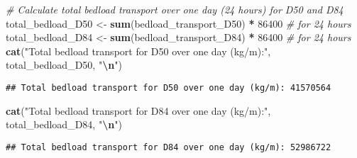 \documentclass[
]{article}
\newenvironment{Shaded}{\begin{snugshade}}{\end{snugshade}}
\newcommand{\CommentTok}[1]{\textcolor[rgb]{0.56,0.35,0.01}{\textit{#1}}}
\newcommand{\DecValTok}[1]{\textcolor[rgb]{0.00,0.00,0.81}{#1}}
\newcommand{\FunctionTok}[1]{\textcolor[rgb]{0.13,0.29,0.53}{\textbf{#1}}}
\newcommand{\NormalTok}[1]{#1}
\newcommand{\OtherTok}[1]{\textcolor[rgb]{0.56,0.35,0.01}{#1}}
\newcommand{\SpecialCharTok}[1]{\textcolor[rgb]{0.81,0.36,0.00}{\textbf{#1}}}
\newcommand{\StringTok}[1]{\textcolor[rgb]{0.31,0.60,0.02}{#1}}
\begin{document}
\begin{Shaded}
\begin{Highlighting}[]
\CommentTok{\# Calculate total bedload transport over one day (24 hours) for D50 and D84}
\NormalTok{total\_bedload\_D50 }\OtherTok{\textless{}{-}} \FunctionTok{sum}\NormalTok{(bedload\_transport\_D50) }\SpecialCharTok{*} \DecValTok{86400}  \CommentTok{\# for 24 hours}
\NormalTok{total\_bedload\_D84 }\OtherTok{\textless{}{-}} \FunctionTok{sum}\NormalTok{(bedload\_transport\_D84) }\SpecialCharTok{*} \DecValTok{86400}  \CommentTok{\# for 24 hours}
\FunctionTok{cat}\NormalTok{(}\StringTok{"Total bedload transport for D50 over one day (kg/m):"}\NormalTok{, total\_bedload\_D50, }\StringTok{"}\SpecialCharTok{\textbackslash{}n}\StringTok{"}\NormalTok{)}
\end{Highlighting}
\end{Shaded}

\begin{verbatim}
## Total bedload transport for D50 over one day (kg/m): 41570564
\end{verbatim}

\begin{Shaded}
\begin{Highlighting}[]
\FunctionTok{cat}\NormalTok{(}\StringTok{"Total bedload transport for D84 over one day (kg/m):"}\NormalTok{, total\_bedload\_D84, }\StringTok{"}\SpecialCharTok{\textbackslash{}n}\StringTok{"}\NormalTok{)}
\end{Highlighting}
\end{Shaded}

\begin{verbatim}
## Total bedload transport for D84 over one day (kg/m): 52986722
\end{verbatim}
\end{document}
